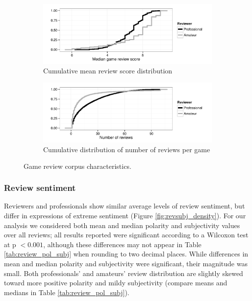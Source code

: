 \documentclass[letterpaper]{article}
\begin{document}
\begin{figure}[tb]
\centering


\begin{subfigure}[b]{\linewidth}
\includegraphics[width=\linewidth]{./console_games_scoremedian_ecdf}
\caption{Cumulative mean review score distribution}
\label{fig:game_score}
\end{subfigure}
\begin{subfigure}[b]{\linewidth}
\includegraphics[width=\linewidth]{./console_games_numreviews_ecdf}
\caption{Cumulative distribution of number of reviews per game}
\label{fig:game_reviewnum}
\end{subfigure}
\caption{Game review corpus characteristics.}
\label{fig:revscore_console}
\end{figure}

\subsubsection{Review sentiment}
Reviewers and professionals show similar average levels of review sentiment, but differ in expressions of extreme sentiment (Figure \ref{fig:revsubj_density}).
For our analysis we considered both mean and median polarity and subjectivity values over all reviews; all results reported were significant according to a Wilcoxon test at p $< 0.001$, although these differences may not appear in Table \ref{tab:review_pol_subj} when rounding to two decimal places. While differences in mean and median polarity and subjectivity were significant, their magnitude was small.
Both professionals' and amateurs' review distribution are slightly skewed toward more positive polarity and mildy subjectivity (compare means and medians in Table \ref{tab:review_pol_subj}). 
\end{document}
